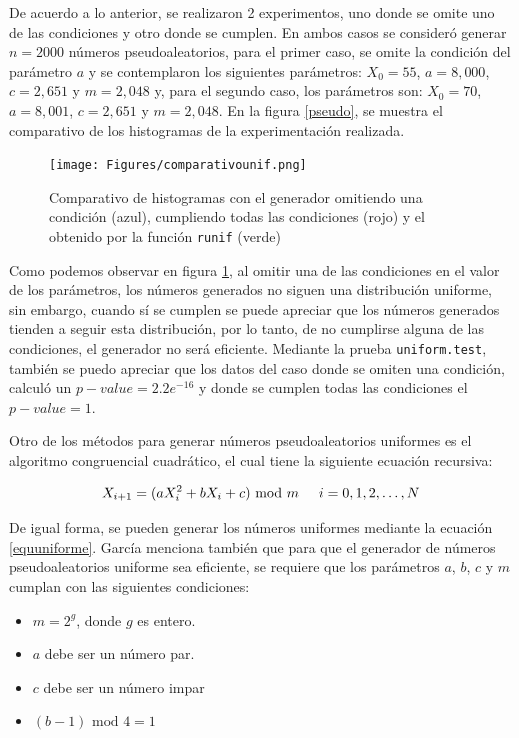 \documentclass{article}
\begin{document}
De acuerdo a lo anterior, se realizaron 2 experimentos, uno donde se omite uno de las condiciones y otro donde se cumplen. En ambos casos se consideró generar $n=2000$ números pseudoaleatorios, para el primer caso, se omite la condición del parámetro $a$ y se contemplaron los siguientes parámetros: $X_{0}=55$, $a = 8,000$, $c = 2,651$ y $m = 2,048$ y, para el segundo caso, los parámetros son: $X_{0}=70$, $a = 8,001$, $c = 2,651$ y $m = 2,048$. En la figura \ref{pseudo}, se muestra el comparativo de los histogramas de la experimentación realizada.

\begin{figure}
\centering
\texttt{[image: Figures/comparativounif.png]}
\caption{Comparativo de histogramas con el generador omitiendo una condición (azul), cumpliendo todas las condiciones (rojo) y el obtenido por la función \texttt{runif} (verde)}
\label{pseudouniforme}
\end{figure}

Como podemos observar en figura \ref{pseudouniforme}, al omitir una de las condiciones en el valor de los parámetros, los números generados no siguen una distribución uniforme, sin embargo, cuando sí se cumplen se puede apreciar que los números generados tienden a seguir esta distribución, por lo tanto, de no cumplirse alguna de las condiciones, el generador no será eficiente. Mediante la prueba \texttt{uniform.test}, también se puedo apreciar que los datos del caso donde se omiten una condición, calculó un $p-value = 2.2e^{-16}$  y donde se cumplen todas las condiciones el $p-value = 1$.

Otro de los métodos para generar números pseudoaleatorios uniformes es el algoritmo congruencial cuadrático, el cual tiene la siguiente ecuación recursiva:

\begin{equation}
X_ {i+1}= (aX_{i}^{2} + bX_{i} + c) \text{ mod } m \hspace{0,5cm}i=0, 1, 2, \dots, N
\end{equation}

De igual forma, se pueden generar los números uniformes mediante la ecuación \ref{equuniforme}. García \cite{promodel} menciona también que para que el generador de números pseudoaleatorios uniforme sea eficiente, se requiere que los parámetros $a$, $b$, $c$ y $m$ cumplan con las siguientes condiciones:

\begin{itemize}
    \item $m = 2^g$, donde $g$ es entero.
    \item $a$ debe ser un número par.
    \item $c$ debe ser un número impar
    \item $(b-1) \text{ mod } 4 = 1$ 
\end{itemize}
\end{document}

